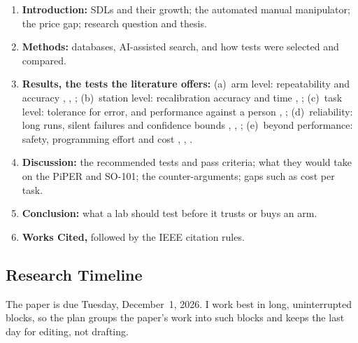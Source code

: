 \begin{enumerate}[1.]
  \item \textbf{Introduction:} SDLs and their growth; the automated manual manipulator; the
    price gap; research question and thesis.
  \item \textbf{Methods:} databases, AI-assisted search, and how tests were selected and
    compared.
  \item \textbf{Results, the tests the literature offers:}
    (a)~arm level: repeatability and accuracy \cite{harazono2024}, \cite{quigley2011},
    \cite{chajon2026};
    (b)~station level: recalibration accuracy and time \cite{burger2020}, \cite{zhou2025};
    (c)~task level: tolerance for error, and performance against a person
    \cite{harazono2024}, \cite{rupp2022};
    (d)~reliability: long runs, silent failures and confidence bounds \cite{zhou2025},
    \cite{wattoo2024}, \cite{vincent2024};
    (e)~beyond performance: safety, programming effort and cost \cite{tom2024},
    \cite{doloi2025}, \cite{ferraguti2019}.
  \item \textbf{Discussion:} the recommended tests and pass criteria; what they would take on
    the PiPER and SO-101; the counter-arguments; gaps such as cost per task.
  \item \textbf{Conclusion:} what a lab should test before it trusts or buys an arm.
  \item \textbf{Works Cited,} followed by the IEEE citation rules.
\end{enumerate}

\subsection{Research Timeline}

The paper is due Tuesday, December~1, 2026. I work best in long, uninterrupted blocks, so the
plan groups the paper's work into such blocks and keeps the last day for editing, not drafting.

